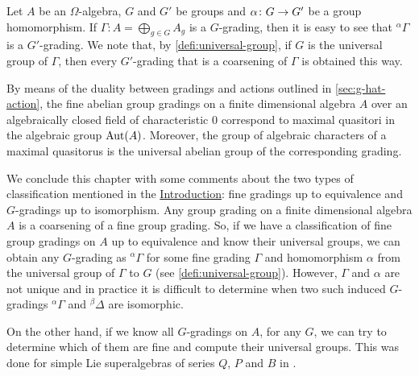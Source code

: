 \begin{remark}\label{rmk:coars-grp-induced}
    Let $A$ be an $\Omega$-algebra, $G$ and $G'$ be groups and $\alpha\colon G \to G'$ be a group homomorphism. 
    If $\Gamma : A = \bigoplus_{g\in G} A_g$ is a $G$-grading, then it is easy to see that ${}^{\alpha} \Gamma$ is a $G'$-grading. 
    We note that, by \cref{defi:universal-group}, if $G$ is the universal group of $\Gamma$, then every $G'$-grading that is a coarsening of $\Gamma$ is obtained this way.  
\end{remark}

By means of the duality between gradings and actions outlined in \cref{sec:g-hat-action}, the fine abelian group gradings on a finite dimensional algebra $A$ over an algebraically closed field of characteristic $0$ correspond to maximal quasitori in the algebraic group $\operatorname{Aut}(A)$. 
Moreover, the group of algebraic characters of a maximal quasitorus is the universal abelian group of the corresponding grading.  

We conclude this chapter with some comments about the two types of classification mentioned in the \hyperref[intro-equiv]{Introduction}: fine gradings up to equivalence and $G$-gradings up to isomorphism. 
%
Any group grading on a finite dimensional algebra $A$ is a coarsening of a fine group grading. 
So, if we have a classification of fine group gradings on $A$ up to equivalence and know their universal groups, we can obtain any $G$-grading as $^{\alpha}\Gamma$ for some fine grading $\Gamma$ and homomorphism $\alpha$ from the universal group of $\Gamma$ to $G$ (see \cref{defi:universal-group}). 
However, $\Gamma$ and $\alpha$ are not unique and in practice it is difficult to determine when two such induced $G$-gradings $^{\alpha}\Gamma$ and $^{\beta}\Delta$ are isomorphic. 

On the other hand, if we know all $G$-gradings on $A$, for any $G$, we can try to determine which of them are fine and compute their universal groups. 
This was done for simple Lie superalgebras of series $Q$, $P$ and $B$ in \cite{paper-Qn,paper-MAP,Helens_thesis}. 




